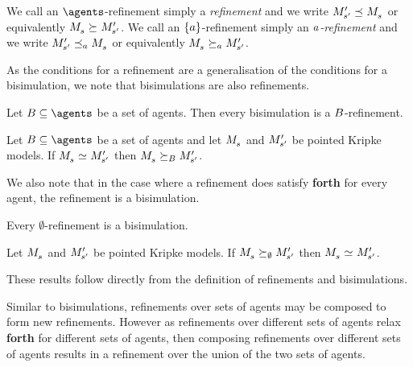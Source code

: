 We call an $\agents$-refinement simply a {\em refinement} and we write $\kPModelP{\kStateSP} \refines \kPModel{\kStateS}$ or equivalently $\kPModel{\kStateS} \simulates \kPModelP{\kStateSP}$.
We call an $\{a\}$-refinement simply an {\em $a$-refinement} and we write $\kPModelP{\kStateSP} \refinesA \kPModel{\kStateS}$ or equivalently $\kPModel{\kStateS} \simulatesA \kPModelP{\kStateSP}$.

As the conditions for a refinement are a generalisation of the conditions for a bisimulation, we note that bisimulations are also refinements.

\begin{proposition}\label{bisimulation-refinement}
Let $\agentsB \subseteq \agents$ be a set of agents. Then every bisimulation is a $B$-refinement.
\end{proposition}

\begin{corollary}\label{bisimilar-refinement}
Let $\agentsB \subseteq \agents$ be a set of agents and let $\kPModel{\kStateS}$ and ${M^{\prime}_{{s}^{\prime}}}$ be pointed Kripke models.
If $\kPModel{\kStateS} \bisimilar \kPModelP{\kStateSP}$ then $\kPModel{\kStateS} \simulatesBs \kPModelP{\kStateSP}$.
\end{corollary}

We also note that in the case where a refinement does satisfy {\bf forth} for every agent, the refinement is a bisimulation.

\begin{proposition}\label{refinement-bisimulation}
Every $\emptyset$-refinement is a bisimulation.
\end{proposition}

\begin{corollary}\label{refinement-bisimilar}
Let $\kPModel{\kStateS}$ and ${M^{\prime}_{{s}^{\prime}}}$ be pointed Kripke models.
If $\kPModel{\kStateS} \simulates[\emptyset] \kPModelP{\kStateSP}$ then $\kPModel{\kStateS} \bisimilar \kPModelP{\kStateSP}$.
\end{corollary}

These results follow directly from the definition of refinements and bisimulations.

Similar to bisimulations, refinements over sets of agents may be composed to form new refinements.
However as refinements over different sets of agents relax {\bf forth} for different sets of agents, then composing refinements over different sets of agents results in a refinement over the union of the two sets of agents.

